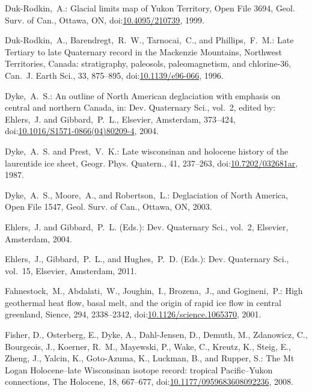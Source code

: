 \documentclass[tc, manuscript]{copernicus}
\begin{document}
\begin{thebibliography}{114}
Duk-Rodkin,~A.: Glacial limits map of Yukon Territory, Open File 3694, Geol. Surv. of Can., Ottawa, ON,
doi:\href{http://dx.doi.org/10.4095/210739}{10.4095/210739}, 1999.


Duk-Rodkin,~A., Barendregt,~R.~W., Tarnocai,~C., and Phillips,~F.~M.: Late Tertiary to late Quaternary record in the Mackenzie Mountains, Northwest Territories, Canada: stratigraphy, paleosols, paleomagnetism, and chlorine-36, Can.~J. Earth Sci., 33, 875--895,
doi:\href{http://dx.doi.org/10.1139/e96-066}{10.1139/e96-066}, 1996.


Dyke,~A.~S.: An outline of North American deglaciation with emphasis
on central and northern Canada, in: Dev. Quaternary Sci., vol.~2,
edited by: Ehlers,~J. and Gibbard,~P.~L., Elsevier, Amsterdam, 373--424,
doi:\href{http://dx.doi.org/10.1016/S1571-0866(04)80209-4}{10.1016/S1571-0866(04)80209-4}, 2004.


Dyke,~A.~S. and Prest,~V.~K.: Late wisconsinan and holocene history of the laurentide ice sheet, G{e}ogr. Phys. Quatern., 41, 237--263,
doi:\href{http://dx.doi.org/10.7202/032681ar}{10.7202/032681ar}, 1987.


Dyke,~A.~S., Moore,~A., and Robertson,~L.: Deglaciation of North America, Open File 1547, Geol. Surv. of Can., Ottawa, ON, 2003.


Ehlers,~J. and Gibbard,~P.~L. (Eds.): Dev. Quaternary Sci., vol.~2, Elsevier, Amsterdam, 2004.


Ehlers,~J., Gibbard,~P.~L., and Hughes,~P.~D. (Eds.):  Dev. Quaternary
Sci., vol.~15, Elsevier, Amsterdam, 2011.


Fahnestock,~M., Abdalati,~W., Joughin,~I., Brozena,~J., and Gogineni,~P.: High geothermal heat flow, basal melt, and the origin of rapid ice flow in central greenland, Sience, 294, 2338--2342,
doi:\href{http://dx.doi.org/10.1126/science.1065370}{10.1126/science.1065370}, 2001.


Fisher, D., Osterberg, E., Dyke, A., Dahl-Jensen, D., Demuth, M., Zdanowicz, C., Bourgeois, J., Koerner, R.~M., Mayewski, P., Wake, C., Kreutz, K., Steig, E., Zheng, J., Yalcin, K., Goto-Azuma, K., Luckman, B., and Rupper, S.: The Mt Logan Holocene--late Wisconsinan isotope record: tropical Pacific--Yukon connections, The Holocene, 18, 667--677,
doi:\href{http://dx.doi.org/10.1177/0959683608092236}{10.1177/0959683608092236}, 2008.



\end{thebibliography}
\end{document}
